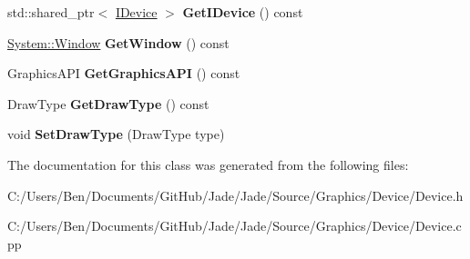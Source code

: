 \begin{DoxyCompactItemize}
\item 
\hypertarget{class_jade_1_1_graphics_1_1_device_a635de94382dbe1b6072d34bbc3222616}{}std\+::shared\+\_\+ptr$<$ \hyperlink{struct_jade_1_1_graphics_1_1_i_device}{I\+Device} $>$ {\bfseries Get\+I\+Device} () const \label{class_jade_1_1_graphics_1_1_device_a635de94382dbe1b6072d34bbc3222616}

\item 
\hypertarget{class_jade_1_1_graphics_1_1_device_a556a4483ba9e3db52a9a70e5911460d1}{}\hyperlink{class_jade_1_1_system_1_1_window}{System\+::\+Window} {\bfseries Get\+Window} () const \label{class_jade_1_1_graphics_1_1_device_a556a4483ba9e3db52a9a70e5911460d1}

\item 
\hypertarget{class_jade_1_1_graphics_1_1_device_add64b3329cc1039e842f4b9f67b7110d}{}Graphics\+A\+P\+I {\bfseries Get\+Graphics\+A\+P\+I} () const \label{class_jade_1_1_graphics_1_1_device_add64b3329cc1039e842f4b9f67b7110d}

\item 
\hypertarget{class_jade_1_1_graphics_1_1_device_a8340efa1f96a8f5a8752be263f9ce3b3}{}Draw\+Type {\bfseries Get\+Draw\+Type} () const \label{class_jade_1_1_graphics_1_1_device_a8340efa1f96a8f5a8752be263f9ce3b3}

\item 
\hypertarget{class_jade_1_1_graphics_1_1_device_a4b2ed684631822b422081ba81997844d}{}void {\bfseries Set\+Draw\+Type} (Draw\+Type type)\label{class_jade_1_1_graphics_1_1_device_a4b2ed684631822b422081ba81997844d}

\end{DoxyCompactItemize}


The documentation for this class was generated from the following files\+:\begin{DoxyCompactItemize}
\item 
C\+:/\+Users/\+Ben/\+Documents/\+Git\+Hub/\+Jade/\+Jade/\+Source/\+Graphics/\+Device/Device.\+h\item 
C\+:/\+Users/\+Ben/\+Documents/\+Git\+Hub/\+Jade/\+Jade/\+Source/\+Graphics/\+Device/Device.\+cpp\end{DoxyCompactItemize}
